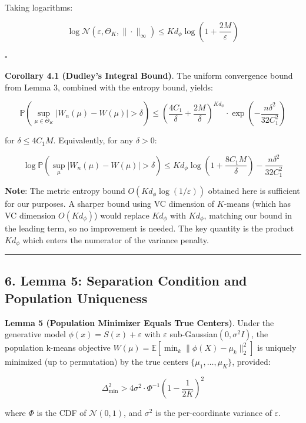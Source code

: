 \documentclass[
  12pt,
]{article}
\begin{document}
Taking logarithms:

\[\log \mathcal{N}\left(\varepsilon, \Theta_K, \|\cdot\|_\infty\right) \leq K d_\phi \log\left(1 + \frac{2M}{\varepsilon}\right)\]

\(\square\)

\textbf{Corollary 4.1 (Dudley's Integral Bound)}. The uniform
convergence bound from Lemma 3, combined with the entropy bound, yields:

\[\mathbb{P}\left(\sup_{\mu \in \Theta_K} |W_n(\mu) - W(\mu)| > \delta\right) \leq \left(\frac{4C_1}{\delta} + \frac{2M}{\delta}\right)^{K d_\phi} \cdot \exp\left(-\frac{n\delta^2}{32 C_1^2}\right)\]

for \(\delta \leq 4C_1 M\). Equivalently, for any \(\delta > 0\):

\[\log \mathbb{P}\left(\sup_{\mu} |W_n(\mu) - W(\mu)| > \delta\right) \leq K d_\phi \log\left(1 + \frac{8C_1 M}{\delta}\right) - \frac{n\delta^2}{32 C_1^2}\]

\textbf{Note}: The metric entropy bound
\(O(K d_\phi \log(1/\varepsilon))\) obtained here is sufficient for our
purposes. A sharper bound using VC dimension of \(K\)-means (which has
VC dimension \(O(K d_\phi)\)) would replace \(K d_\phi\) with
\(K d_\phi\), matching our bound in the leading term, so no improvement
is needed. The key quantity is the product \(K d_\phi\) which enters the
numerator of the variance penalty.

\begin{center}\rule{0.5\linewidth}{0.5pt}\end{center}

\subsection{6. Lemma 5: Separation Condition and Population
Uniqueness}\label{lemma-5-separation-condition-and-population-uniqueness}

\textbf{Lemma 5 (Population Minimizer Equals True Centers)}. Under the
generative model \(\phi(x) = S(x) + \varepsilon\) with \(\varepsilon\)
sub-Gaussian\((0, \sigma^2 I)\), the population k-means objective
\(W(\mu) = \mathbb{E}[\min_k \|\phi(X) - \mu_k\|_2^2]\) is uniquely
minimized (up to permutation) by the true centers
\(\{\mu_1, \dots, \mu_K\}\), provided:

\[\Delta_{\min}^2 > 4\sigma^2 \cdot \Phi^{-1}\left(1 - \frac{1}{2K}\right)^2\]

where \(\Phi\) is the CDF of \(\mathcal{N}(0,1)\), and \(\sigma^2\) is
the per-coordinate variance of \(\varepsilon\).
\end{document}
